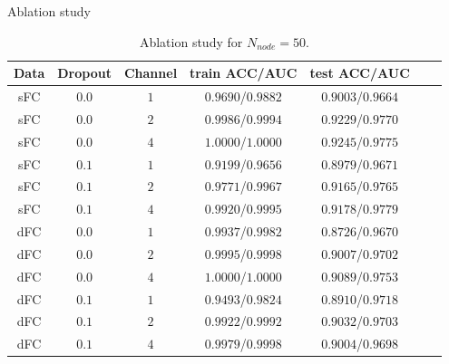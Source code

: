 \documentclass{beamer}
\begin{document}
\begin{frame}{Ablation study}

    \begin{table}[H]
        \centering
        \begin{tabular}{|c|c|c|c|c|c|c|}
            \hline
            Data & Dropout & Channel & train ACC/AUC     & test ACC/AUC      \\
            \hline
            sFC  & $0.0$   & $1$     & $0.9690$/$0.9882$ & $0.9003$/$0.9664$ \\
            \hline
            sFC  & $0.0$   & $2$     & $0.9986$/$0.9994$ & $0.9229$/$0.9770$ \\
            \hline
            sFC  & $0.0$   & $4$     & $1.0000$/$1.0000$ & $0.9245$/$0.9775$ \\
            \hline
            sFC  & $0.1$   & $1$     & $0.9199$/$0.9656$ & $0.8979$/$0.9671$ \\
            \hline
            sFC  & $0.1$   & $2$     & $0.9771$/$0.9967$ & $0.9165$/$0.9765$ \\
            \hline
            sFC  & $0.1$   & $4$     & $0.9920$/$0.9995$ & $0.9178$/$0.9779$ \\
            \hline
            dFC  & $0.0$   & $1$     & $0.9937$/$0.9982$ & $0.8726$/$0.9670$ \\
            \hline
            dFC  & $0.0$   & $2$     & $0.9995$/$0.9998$ & $0.9007$/$0.9702$ \\
            \hline
            dFC  & $0.0$   & $4$     & $1.0000$/$1.0000$ & $0.9089$/$0.9753$ \\
            \hline
            dFC  & $0.1$   & $1$     & $0.9493$/$0.9824$ & $0.8910$/$0.9718$ \\
            \hline
            dFC  & $0.1$   & $2$     & $0.9922$/$0.9992$ & $0.9032$/$0.9703$ \\
            \hline
            dFC  & $0.1$   & $4$     & $0.9979$/$0.9998$ & $0.9004$/$0.9698$ \\
            \hline
        \end{tabular}
        \caption{Ablation study for $N_{node} = 50$.}
    \end{table}

\end{frame}
\end{document}
